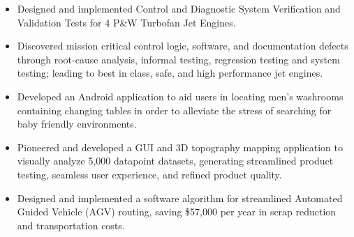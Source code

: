 \documentclass[11pt,a4paper,sans]{moderncv} %
\begin{document}
{
\begin{itemize}
	\item Designed and implemented Control and Diagnostic System Verification and Validation Tests for 4 P\&W Turbofan Jet Engines. 
	\item Discovered mission critical control logic, software, and documentation defects through root-cause analysis, informal testing, regression testing and system testing; leading to best in class, safe, and high performance jet engines.
\end{itemize}
}


{
\begin{itemize}
	\item Developed an Android application to aid users in locating men's washrooms containing changing tables in order to alleviate the stress of searching for baby friendly environments.
\end{itemize}
}

{
\begin{itemize}
	\item Pioneered and developed a GUI and 3D topography mapping application to visually analyze 5,000 datapoint datasets, generating streamlined product testing, seamless user experience, and refined product quality.
\end{itemize}
}

{
\begin{itemize}
	\item Designed and implemented a software algorithm for streamlined Automated Guided Vehicle (AGV) routing, saving \$57,000 per year in scrap reduction and transportation costs.
\end{itemize}
}

\end{document}

